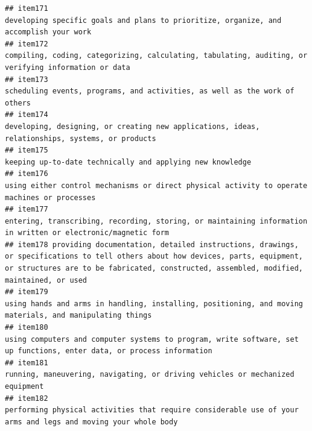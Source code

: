 \documentclass[
  man]{apa6}
\begin{document}
\begin{verbatim}
## item171                                                                                                                                     developing specific goals and plans to prioritize, organize, and accomplish your work
## item172                                                                                                                      compiling, coding, categorizing, calculating, tabulating, auditing, or verifying information or data
## item173                                                                                                                                                scheduling events, programs, and activities, as well as the work of others
## item174                                                                                                                           developing, designing, or creating new applications, ideas, relationships, systems, or products
## item175                                                                                                                                                                 keeping up-to-date technically and applying new knowledge
## item176                                                                                                                              using either control mechanisms or direct physical activity to operate machines or processes
## item177                                                                                                             entering, transcribing, recording, storing, or maintaining information in written or electronic/magnetic form
## item178 providing documentation, detailed instructions, drawings, or specifications to tell others about how devices, parts, equipment, or structures are to be fabricated, constructed, assembled, modified, maintained, or used
## item179                                                                                                                  using hands and arms in handling, installing, positioning, and moving materials, and manipulating things
## item180                                                                                                     using computers and computer systems to program, write software, set up functions, enter data, or process information
## item181                                                                                                                                             running, maneuvering, navigating, or driving vehicles or mechanized equipment
## item182                                                                                                             performing physical activities that require considerable use of your arms and legs and moving your whole body

\end{verbatim}
\end{document}
